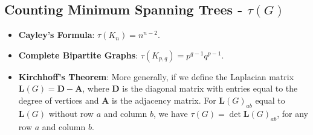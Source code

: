 \subsection{Counting Minimum Spanning Trees - \texorpdfstring{$\tau(G)$}{}}

\begin{itemize}
    \item \textbf{Cayley's Formula}:
    $\tau(K_n) = n^{n-2}$.

    \item \textbf{Complete Bipartite Graphs}:
    $\tau(K_{p,q}) = p^{q-1}q^{p-1}$.

    \item \textbf{Kirchhoff's Theorem}:
    More generally, if we define the Laplacian matrix
    $\mathbf{L}(G) = \mathbf{D} - \mathbf{A}$, where $\mathbf{D}$ is the diagonal matrix with entries equal to the degree of vertices and $\mathbf{A}$ is the adjacency matrix. For $\mathbf{L}(G)_{ab}$ equal to $\mathbf{L}(G)$ without row $a$ and column $b$, we have $\tau(G) = \det{\mathbf{L}(G)_{ab}}$, for any row $a$ and column $b$.

\end{itemize}
